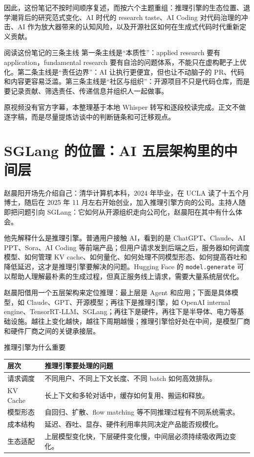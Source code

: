 \documentclass[a4paper]{article}
\begin{document}
因此，这份笔记不按时间顺序复述，而按六个主题重组：推理引擎的生态位置、退学潮背后的研究范式变化、AI 时代的 research taste、AI Coding 对代码治理的冲击、AI 作为放大器带来的认知风险，以及开源社区如何在生成式代码时代重新定义贡献。

\begin{importantbox}{阅读这份笔记的三条主线}
第一条主线是“本质性”：applied research 要有 application，fundamental research 要有自洽的问题体系，不能只在虚构靶子上优化。第二条主线是“责任边界”：AI 让执行更便宜，但也让不动脑子的 PR、代码和内容更容易泛滥。第三条主线是“社区与组织”：开源项目不只是代码仓库，而是要记录贡献、筛选责任、传递信息并组织人一起做事。
\end{importantbox}

原视频没有官方字幕，本整理基于本地 Whisper 转写和逐段校读完成。正文不做逐字稿，而是尽量提炼访谈中的判断链条和可迁移观点。

\section{SGLang 的位置：AI 五层架构里的中间层}

赵晨阳开场先介绍自己：清华计算机本科，2024 年毕业，在 UCLA 读了十五个月博士，随后在 2025 年 11 月左右开始创业，加入推理引擎方向的公司。主持人随即把问题引向 SGLang：它如何从开源组织走向公司化，赵晨阳在其中有什么体会。

他先解释什么是推理引擎。普通用户接触 AI，看到的是 ChatGPT、Claude、AI PPT、Sora、AI Coding 等前端产品；但用户请求发到后端之后，服务器如何调度模型、如何管理 KV cache、如何量化、如何处理不同模型形态、如何提高吞吐和降低延迟，这才是推理引擎要解决的问题。Hugging Face 的 \texttt{model.generate} 可以帮助人理解最朴素的生成过程，但真正服务线上请求，需要大量系统层优化。

赵晨阳借用一个五层架构来定位推理：最上层是 Agent 和应用；下面是具体模型，如 Claude、GPT、开源模型；再往下是推理引擎，如 OpenAI internal engine、TensorRT-LLM、SGLang；再往下是硬件，再往下是半导体、电力等基础设施。越往上变化越快，越往下周期越慢；推理引擎恰好处在中间，是模型厂商和硬件厂商之间的关键承接层。

\begin{knowledgebox}{推理引擎为什么重要}
\begin{tabularx}{\textwidth}{>{\raggedright\arraybackslash}p{} Y}
\toprule
层次 & 推理引擎要处理的问题 \\
\midrule
请求调度 & 不同用户、不同上下文长度、不同 batch 如何高效排队。 \\
KV Cache & 长上下文和多轮对话中，缓存如何复用、搬运和释放。 \\
模型形态 & 自回归、扩散、flow matching 等不同推理过程有不同系统需求。 \\
成本结构 & 延迟、吞吐、显存、硬件利用率共同决定产品能否规模化。 \\
生态适配 & 上层模型变化快，下层硬件变化慢，中间层必须持续吸收两边变化。 \\
\bottomrule
\end{tabularx}
\end{knowledgebox}
\end{document}
